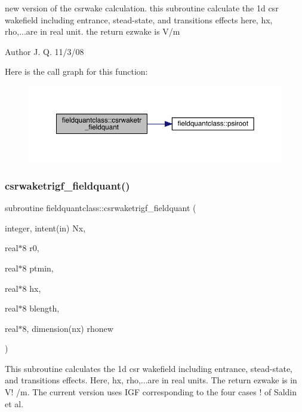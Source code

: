 new version of the csrwake calculation. this subroutine calculate the 1d csr wakefield including entrance, stead-\/state, and transitions effects here, hx, rho,...are in real unit. the return ezwake is V/m 

\begin{DoxyAuthor}{Author}
J. Q. 11/3/08 
\end{DoxyAuthor}
Here is the call graph for this function\+:\nopagebreak
\begin{figure}[H]
\begin{center}
\leavevmode
\includegraphics[width=350pt]{namespacefieldquantclass_a773b62d57c290818337131902b979b43_cgraph}
\end{center}
\end{figure}
\mbox{\label{namespacefieldquantclass_ac3c0238f350487871fdbe6a84bcdfc2e}} 
\subsubsection{\texorpdfstring{csrwaketrigf\_fieldquant()}{csrwaketrigf\_fieldquant()}}
{\footnotesize\ttfamily subroutine fieldquantclass\+::csrwaketrigf\+\_\+fieldquant (\begin{DoxyParamCaption}\item[{integer, intent(in)}]{Nx,  }\item[{real$\ast$8}]{r0,  }\item[{real$\ast$8}]{ptmin,  }\item[{real$\ast$8}]{hx,  }\item[{real$\ast$8}]{blength,  }\item[{real$\ast$8, dimension(nx)}]{rhonew }\end{DoxyParamCaption})}



This subroutine calculates the 1d csr wakefield including entrance, stead-\/state, and transitions effects. Here, hx, rho,...are in real units. The return ezwake is in V! /m. The current version uses I\+GF corresponding to the four cases ! of Saldin et al. 


